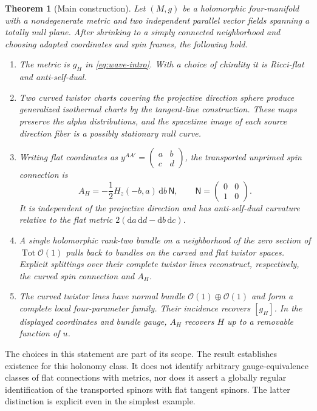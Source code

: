 \documentclass[11pt]{article}
\numberwithin{equation}{section}
\newtheorem{theorem}{Theorem}[section]
\theoremstyle{definition}
\theoremstyle{remark}
\newcommand{\OO}{\mathcal O}
\newcommand{\dd}{\mathrm d}
\newcommand{\Tot}{\operatorname{Tot}}
\newcommand{\NN}{\mathsf N}
\begin{document}
\begin{theorem}[Main construction]\label{thm:main}
Let $(M,g)$ be a holomorphic four-manifold with a nondegenerate metric and two independent parallel vector fields spanning a totally null plane. After shrinking to a simply connected neighborhood and choosing adapted coordinates and spin frames, the following hold.
\begin{enumerate}[label=\textup{(\roman*)},leftmargin=*]
\item The metric is $g_H$ in \eqref{eq:wave-intro}. With a choice of chirality it is Ricci-flat and anti-self-dual.
\item Two curved twistor charts covering the projective direction sphere produce generalized isothermal charts by the tangent-line construction. These maps preserve the alpha distributions, and the spacetime image of each source direction fiber is a possibly stationary null curve.
\item Writing flat coordinates as $y^{AA'}=\left(\begin{smallmatrix}a&b\\c&d\end{smallmatrix}\right)$, the transported unprimed spin connection is
\begin{equation}\label{eq:main-A}
A_H=-\frac12 H_z(-b,a)\,\dd b\,\NN,
\qquad \NN=\begin{pmatrix}0&0\\1&0\end{pmatrix}.
\end{equation}
It is independent of the projective direction and has anti-self-dual curvature relative to the flat metric $2(\dd a\,\dd d-\dd b\,\dd c)$.
\item A single holomorphic rank-two bundle on a neighborhood of the zero section of $\Tot\OO(1)$ pulls back to bundles on the curved and flat twistor spaces. Explicit splittings over their complete twistor lines reconstruct, respectively, the curved spin connection and $A_H$.
\item The curved twistor lines have normal bundle $\OO(1)\oplus\OO(1)$ and form a complete local four-parameter family. Their incidence recovers $[g_H]$. In the displayed coordinates and bundle gauge, $A_H$ recovers $H$ up to a removable function of $u$.
\end{enumerate}
\end{theorem}

The choices in this statement are part of its scope. The result establishes existence for this holonomy class. It does not identify arbitrary gauge-equivalence classes of flat connections with metrics, nor does it assert a globally regular identification of the transported spinors with flat tangent spinors. The latter distinction is explicit even in the simplest example.
\end{document}
